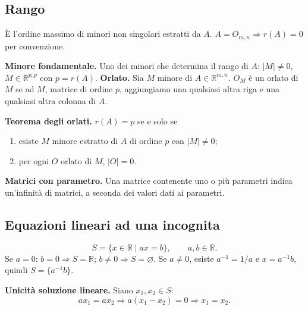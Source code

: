 \documentclass[11pt,a4paper]{article}
\newcommand{\pagina}[1]{\clearpage}
\begin{document}
\subsection*{Rango}
È l'ordine massimo di minori non singolari estratti da $A$.
$A=O_{m,n}\Longrightarrow r(A)=0$ per convenzione.

\textbf{Minore fondamentale.} Uno dei minori che determina il rango di $A$: $|M|\ne0$, $M\in\mathbb R^{p,p}$ con $p=r(A)$.
\pagina{18}
\textbf{Orlato.} Sia $M$ minore di $A\in\mathbb R^{m,n}$. $O_M$ è un orlato di $M$ se ad $M$, matrice di ordine $p$, aggiungiamo una qualsiasi altra riga e una qualsiasi altra colonna di $A$.

\textbf{Teorema degli orlati.} $r(A)=p$ se e solo se
\begin{enumerate}
\item esiste $M$ minore estratto di $A$ di ordine $p$ con $|M|\ne0$;
\item per ogni $O$ orlato di $M$, $|O|=0$.
\end{enumerate}
\textbf{Matrici con parametro.} Una matrice contenente uno o più parametri indica un'infinità di matrici, a seconda dei valori dati ai parametri.
\subsection*{Equazioni lineari ad una incognita}
\[S=\{x\in\mathbb R\mid ax=b\},\qquad a,b\in\mathbb R.\]
Se $a=0$: $b=0\Longrightarrow S=\mathbb R$; $b\ne0\Longrightarrow S=\varnothing$.
Se $a\ne0$, esiste $a^{-1}=1/a$ e $x=a^{-1}b$, quindi $S=\{a^{-1}b\}$.

\textbf{Unicità soluzione lineare.} Siano $x_1,x_2\in S$:
\[ax_1=ax_2\Longrightarrow a(x_1-x_2)=0\Longrightarrow x_1=x_2.\]
\pagina{19}
\end{document}
